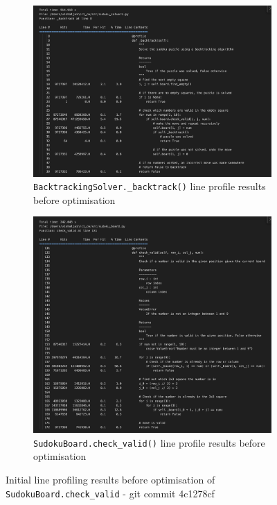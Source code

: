 \documentclass[11pt]{article}
\begin{document}
\begin{figure}[H]
    \centering
    \begin{subfigure}[b]{0.72\textwidth}
        \includegraphics[width=\textwidth]{figs/bt_line_profile_before.png}
        \caption{\texttt{BacktrackingSolver.\_backtrack()} line profile results before optimisation}
        \label{fig:backtrack_before}
    \end{subfigure}
    \begin{subfigure}[b]{0.72\textwidth}
        \includegraphics[width=\textwidth]{figs/check_valid_before.png}
        \caption{\texttt{SudokuBoard.check\_valid()} line profile results before optimisation}
        \label{fig:check_valid_before}
    \end{subfigure}
    \caption{Initial line profiling results before optimisation of \texttt{SudokuBoard.check\_valid} - git commit 4c1278cf}
    \label{fig:line_profiling_initial}
\end{figure}
\end{document}
